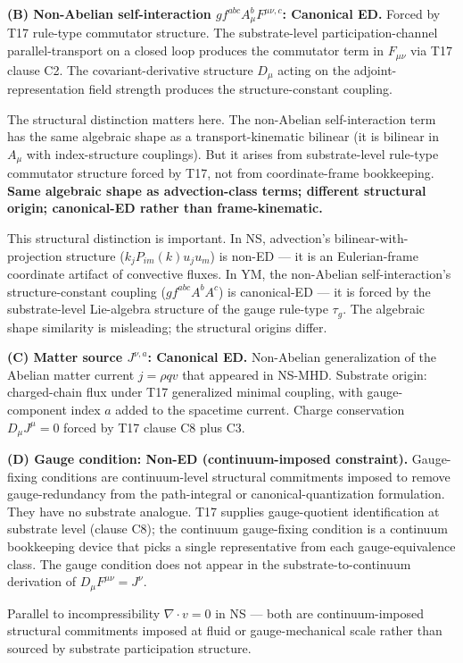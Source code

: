 \documentclass[11pt,a4paper]{article}
\begin{document}
\textbf{(B) Non-Abelian self-interaction $g f^{abc} A_\mu^b F^{\mu\nu,c}$: Canonical ED.} Forced by T17 rule-type commutator structure. The substrate-level participation-channel parallel-transport on a closed loop produces the commutator term in $F_{\mu\nu}$ via T17 clause C2. The covariant-derivative structure $D_\mu$ acting on the adjoint-representation field strength produces the structure-constant coupling.

The structural distinction matters here. The non-Abelian self-interaction term has the same algebraic shape as a transport-kinematic bilinear (it is bilinear in $A_\mu$ with index-structure couplings). But it arises from substrate-level rule-type commutator structure forced by T17, not from coordinate-frame bookkeeping. \textbf{Same algebraic shape as advection-class terms; different structural origin; canonical-ED rather than frame-kinematic.}

This structural distinction is important. In NS, advection's bilinear-with-projection structure ($k_j P_{im}(k) u_j u_m$) is non-ED --- it is an Eulerian-frame coordinate artifact of convective fluxes. In YM, the non-Abelian self-interaction's structure-constant coupling ($g f^{abc} A^b A^c$) is canonical-ED --- it is forced by the substrate-level Lie-algebra structure of the gauge rule-type $\tau_g$. The algebraic shape similarity is misleading; the structural origins differ.

\textbf{(C) Matter source $J^{\nu,a}$: Canonical ED.} Non-Abelian generalization of the Abelian matter current $j = \rho q v$ that appeared in NS-MHD. Substrate origin: charged-chain flux under T17 generalized minimal coupling, with gauge-component index $a$ added to the spacetime current. Charge conservation $D_\mu J^\mu = 0$ forced by T17 clause C8 plus C3.

\textbf{(D) Gauge condition: Non-ED (continuum-imposed constraint).} Gauge-fixing conditions are continuum-level structural commitments imposed to remove gauge-redundancy from the path-integral or canonical-quantization formulation. They have no substrate analogue. T17 supplies gauge-quotient identification at substrate level (clause C8); the continuum gauge-fixing condition is a continuum bookkeeping device that picks a single representative from each gauge-equivalence class. The gauge condition does not appear in the substrate-to-continuum derivation of $D_\mu F^{\mu\nu} = J^\nu$.

Parallel to incompressibility $\nabla\cdot v = 0$ in NS --- both are continuum-imposed structural commitments imposed at fluid or gauge-mechanical scale rather than sourced by substrate participation structure.
\end{document}
